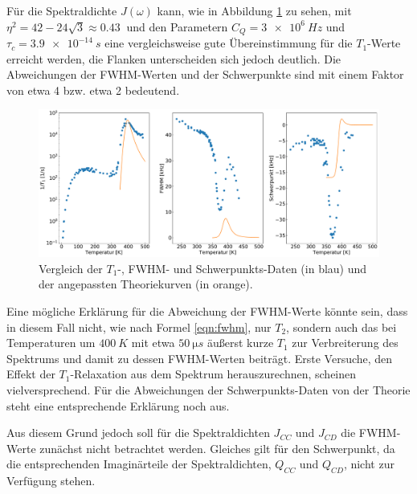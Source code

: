 Für die Spektraldichte $J(\omega)$ kann, wie in Abbildung \ref{fig:triple_vergleich} zu sehen, mit $\eta^2 = 42 - 24 \sqrt{3} \approx \SI{0.43}{}$ \cite{caer} und den Parametern $C_Q = \SI{3e6}{Hz}$ und $\tau_c = \SI{3.9e-14}{s}$ eine vergleichsweise gute Übereinstimmung für die $T_1$-Werte erreicht werden, die Flanken unterscheiden sich jedoch deutlich. Die Abweichungen der FWHM-Werten und der Schwerpunkte sind mit einem Faktor von etwa 4 bzw. etwa 2 bedeutend.
\begin{figure}[htbp]
	\includegraphics[width=\textwidth]{graphics/zwischenbericht/J_fertig.pdf}
	\caption{Vergleich der $T_1$-, FWHM- und Schwerpunkts-Daten (in blau) und der angepassten Theoriekurven (in orange). \label{fig:triple_vergleich}}
\end{figure}

Eine mögliche Erklärung für die Abweichung der FWHM-Werte könnte sein, dass in diesem Fall nicht, wie nach Formel \eqref{eqn:fwhm}, nur $T_2$, sondern auch das bei Temperaturen um $\SI{400}{K}$ mit etwa $\SI{50}{\micro s}$ äußerst kurze $T_1$ zur Verbreiterung des Spektrums und damit zu dessen FWHM-Werten beiträgt. Erste Versuche, den Effekt der $T_1$-Relaxation aus dem Spektrum herauszurechnen, scheinen vielversprechend. Für die Abweichungen der Schwerpunkts-Daten von der Theorie steht eine entsprechende Erklärung noch aus.

Aus diesem Grund jedoch soll für die Spektraldichten $J_{CC}$ und $J_{CD}$ die FWHM-Werte zunächst nicht betrachtet werden. Gleiches gilt für den Schwerpunkt, da die entsprechenden Imaginärteile der Spektraldichten, $Q_{CC}$ und $Q_{CD}$, nicht zur Verfügung stehen.

